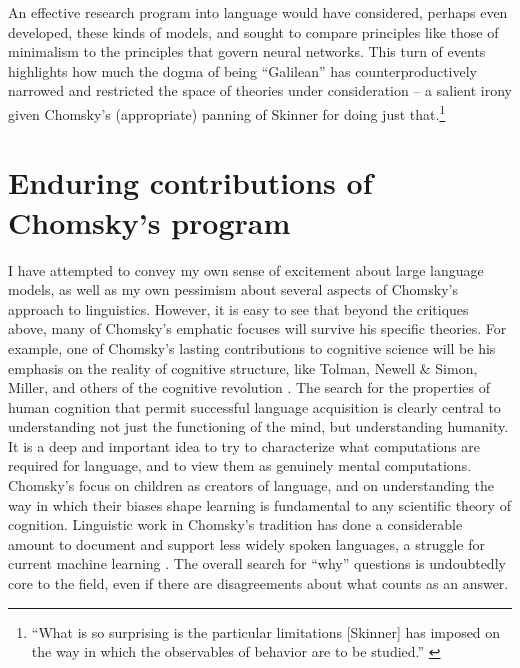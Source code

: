 \documentclass[output=paper,colorlinks,citecolor=brown]{langscibook}
\begin{document}
An effective research program into language would have considered, perhaps even developed, these kinds of models, and sought to compare principles like those of minimalism to the principles that govern neural networks. This turn of events highlights how much the dogma of being ``Galilean'' has counterproductively narrowed and restricted the space of theories under consideration -- a salient irony given Chomsky's (appropriate) panning of Skinner for doing just that.\footnote{``What is so surprising is the particular limitations [Skinner] has imposed on the way in which the observables of behavior are to be studied.'' \citep{chomsky1959chomsky}} 

\section{Enduring contributions of Chomsky's program}

I have attempted to convey my own sense of excitement about large language models, as well as my own pessimism about several aspects of Chomsky's approach to linguistics. However, it is easy to see that beyond the critiques above, many of Chomsky's emphatic focuses will survive his specific theories. For example, one of Chomsky's lasting contributions to cognitive science will be his emphasis on the reality of cognitive structure, like Tolman, Newell \& Simon, Miller, and others of the cognitive revolution \citep{nadel2003cognitive,margaret2008mind}. The search for the properties of human cognition that permit successful language acquisition is clearly central to understanding not just the functioning of the mind, but understanding humanity. It is a deep and important idea to try to characterize what computations are required for language, and to view them as genuinely mental computations. Chomsky's focus on children as creators of language, and on understanding the way in which their biases shape learning is fundamental to any scientific theory of cognition. Linguistic work in Chomsky's tradition has done a considerable amount to document and support less widely spoken languages, a struggle for current machine learning \citep{blasi2021systematic}. The overall search for ``why'' questions is undoubtedly core to the field, even if there are disagreements about what counts as an answer.
\end{document}
